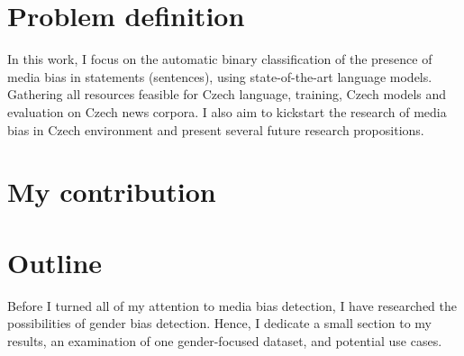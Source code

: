 \section{Problem definition}
In this work, I focus on the automatic binary classification of the presence of media bias in statements (sentences), using state-of-the-art language models. Gathering all resources feasible for Czech language, training, Czech models and evaluation on Czech news corpora. I also aim to kickstart the research of media bias in Czech environment and present several future research propositions.
\section{My contribution}
\section{Outline}
Before I turned all of my attention to media bias detection, I have researched the possibilities of gender bias detection. Hence, I dedicate a small section to my results, an examination of one gender-focused dataset, and potential use cases.
